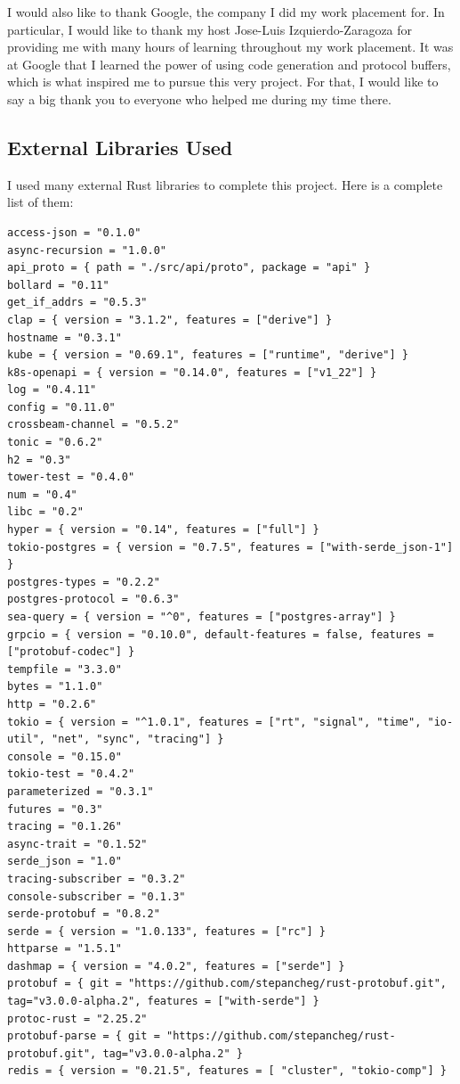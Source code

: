 \documentclass[a4paper,12pt]{report}
\begin{document}
I would also like to thank Google, the company I did my work placement for.
In particular, I would like to thank my host Jose-Luis Izquierdo-Zaragoza for providing me with many hours of learning throughout my work placement.
It was at Google that I learned the power of using code generation and protocol buffers, which is what inspired me to pursue this very project.
For that, I would like to say a big thank you to everyone who helped me during my time there.

\subsection*{External Libraries Used}
I used many external Rust libraries to complete this project. Here is a complete list of them:

\begin{lstlisting}
access-json = "0.1.0"
async-recursion = "1.0.0"
api_proto = { path = "./src/api/proto", package = "api" }
bollard = "0.11"
get_if_addrs = "0.5.3"
clap = { version = "3.1.2", features = ["derive"] }
hostname = "0.3.1"
kube = { version = "0.69.1", features = ["runtime", "derive"] }
k8s-openapi = { version = "0.14.0", features = ["v1_22"] }
log = "0.4.11"
config = "0.11.0"
crossbeam-channel = "0.5.2"
tonic = "0.6.2"
h2 = "0.3"
tower-test = "0.4.0"
num = "0.4"
libc = "0.2"
hyper = { version = "0.14", features = ["full"] }
tokio-postgres = { version = "0.7.5", features = ["with-serde_json-1"] }
postgres-types = "0.2.2"
postgres-protocol = "0.6.3"
sea-query = { version = "^0", features = ["postgres-array"] }
grpcio = { version = "0.10.0", default-features = false, features = ["protobuf-codec"] }
tempfile = "3.3.0"
bytes = "1.1.0"
http = "0.2.6"
tokio = { version = "^1.0.1", features = ["rt", "signal", "time", "io-util", "net", "sync", "tracing"] }
console = "0.15.0"
tokio-test = "0.4.2"
parameterized = "0.3.1"
futures = "0.3"
tracing = "0.1.26"
async-trait = "0.1.52"
serde_json = "1.0"
tracing-subscriber = "0.3.2"
console-subscriber = "0.1.3"
serde-protobuf = "0.8.2"
serde = { version = "1.0.133", features = ["rc"] }
httparse = "1.5.1"
dashmap = { version = "4.0.2", features = ["serde"] }
protobuf = { git = "https://github.com/stepancheg/rust-protobuf.git", tag="v3.0.0-alpha.2", features = ["with-serde"] }
protoc-rust = "2.25.2"
protobuf-parse = { git = "https://github.com/stepancheg/rust-protobuf.git", tag="v3.0.0-alpha.2" }
redis = { version = "0.21.5", features = [ "cluster", "tokio-comp"] }
\end{lstlisting}
\end{document}
